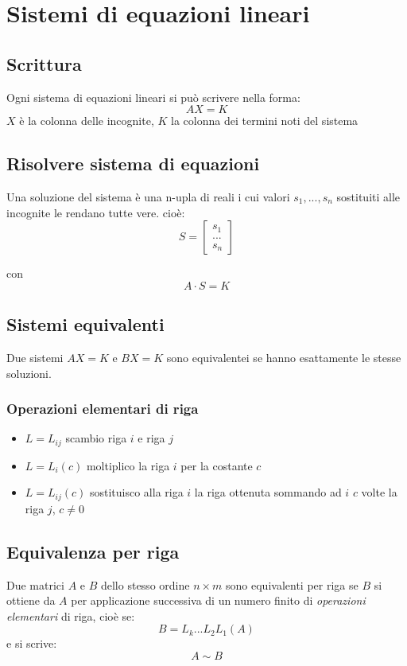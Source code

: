 \section{Sistemi di equazioni lineari}

\subsection{Scrittura}
Ogni sistema di equazioni lineari si può scrivere nella forma:
\[AX=K\]
\(X\) è la colonna delle incognite, \(K\) la colonna dei termini noti del sistema

\subsection{Risolvere sistema di equazioni}
Una soluzione del sistema è una n-upla di reali i cui valori \(s_1,...,s_n\) sostituiti alle incognite le rendano tutte vere. cioè:
\begin{equation*}
	S = 
		\begin{bmatrix}
		s_1 \\
		...\\
		s_n
		\end{bmatrix}
\end{equation*}

con 
\[A\cdot S=K\]

\subsection{Sistemi equivalenti}
Due sistemi \(AX=K\) e \(BX=K\) sono equivalentei se hanno esattamente le stesse soluzioni.

\subsubsection{Operazioni elementari di riga}
\begin{itemize}

	\item \(L=L_{ij}\) scambio riga \(i\) e riga \(j\)
	\item \(L=L_i(c)\) moltiplico la riga \(i\) per la costante \(c\)
	\item \(L=L_{ij}(c)\) sostituisco alla riga \(i\) la riga ottenuta sommando ad \(i\) \(c\) volte la riga \(j\), \(c\neq 0\)

\end{itemize}

\subsection{Equivalenza per riga}
Due matrici \(A\) e \(B\) dello stesso ordine \(n\times m\) sono equivalenti per riga se \(B\) si ottiene da \(A\) per applicazione successiva di un numero finito di \textit{operazioni elementari} di riga, cioè se:
\[B=L_k...L_2L_1(A)\]
e si scrive:
\[A\sim B\]

